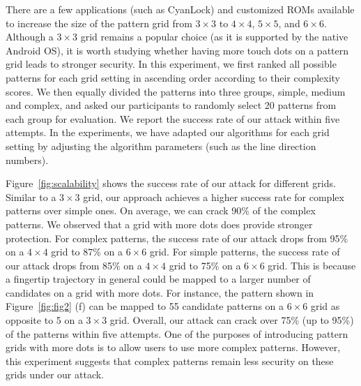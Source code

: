         There are a few applications (such as CyanLock) and customized ROMs available to increase the size of the pattern grid from $3\times3$ to $4\times4$, $5\times5$, and $6\times6$.
        Although a $3 \times 3$ grid remains
        a popular choice (as it is supported by the native Android OS), it is worth studying whether
        having more touch dots on a pattern grid leads to stronger security. In this
        experiment, we first ranked all possible patterns for each grid setting in
        ascending order according to their complexity scores. We then equally
        divided the patterns into three groups, simple, medium and complex,
        and asked our participants to randomly select 20 patterns from each group for evaluation. We
        report the success rate of our attack within five attempts. In the experiments, we have adapted our algorithms for each grid setting
        by adjusting the algorithm parameters (such as the line direction numbers).


        Figure~\ref{fig:scalability} shows the success rate of our attack
        for different grids. Similar to a $3 \times 3$ grid, our
        approach achieves a higher success rate for complex patterns over
        simple ones. On average, we can crack 90\% of the complex patterns.
        We observed that a grid with more dots does provide
        stronger protection. For complex patterns, the success rate of our
        attack drops from 95\% on a $4 \times 4$ grid to 87\% on a $6 \times
        6$ grid. For simple patterns, the success rate of our attack drops
        from 85\% on a $4 \times 4$ grid to 75\% on a $6 \times 6$ grid. This
        is because a fingertip trajectory in general could be mapped to a larger number of
        candidates on a grid with more dots. For instance, the pattern shown
        in Figure~\ref{fig:fig2} (f) can be mapped to 55
        candidate patterns on a $6 \times 6$ grid as opposite to 5 on a $3
        \times 3$ grid. Overall, our attack can crack over 75\% (up to 95\%)
        of the patterns within five attempts. One of the purposes of introducing
        pattern grids with more dots is to allow users to use more complex
        patterns. However, this experiment suggests that complex patterns remain less security on
         these grids under our attack.


